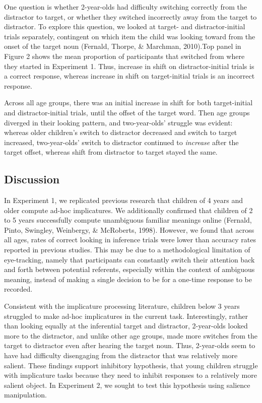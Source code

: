\documentclass[a4paper,man,apacite,floatsintext]{apa6}
\begin{document}
One question is whether 2-year-olds had difficulty switching correctly
from the distractor to target, or whether they switched incorrectly away
from the target to distractor. To explore this question, we looked at
target- and distractor-initial trials separately, contingent on which
item the child was looking toward from the onset of the target noun
(Fernald, Thorpe, \& Marchman, 2010).Top panel in Figure 2 shows the
mean proportion of participants that switched from where they started in
Experiment 1. Thus, increase in shift on distractor-initial trials is a
correct response, whereas increase in shift on target-initial trials is
an incorrect response.

Across all age groups, there was an initial increase in shift for both
target-initial and distractor-initial trials, until the offset of the
target word. Then age groups diverged in their looking pattern, and
two-year-olds' struggle was evident: whereas older children's switch to
distractor decreased and switch to target increased, two-year-olds'
switch to distractor continued to \emph{increase} after the target
offset, whereas shift from distractor to target stayed the same.

\subsection{Discussion}\label{discussion}

In Experiment 1, we replicated previous research that children of 4
years and older compute ad-hoc implicatures. We additionally confirmed
that children of 2 to 5 years successfully compute unambiguous familiar
meanings online (Fernald, Pinto, Swingley, Weinbergy, \& McRoberts,
1998). However, we found that across all ages, rates of correct looking
in inference trials were lower than accuracy rates reported in previous
studies. This may be due to a methodological limitation of eye-tracking,
namely that participants can constantly switch their attention back and
forth between potential referents, especially within the context of
ambiguous meaning, instead of making a single decision to be for a
one-time response to be recorded.

Consistent with the implicature processing literature, children below 3
years struggled to make ad-hoc implicatures in the current task.
Interestingly, rather than looking equally at the inferential target and
distractor, 2-year-olds looked more to the distractor, and unlike other
age groups, made more switches from the target to distractor even after
hearing the target noun. Thus, 2-year-olds seem to have had difficulty
disengaging from the distractor that was relatively more salient. These
findings support inhibitory hypothesis, that young children struggle
with implicature tasks because they need to inhibit responses to a
relatively more salient object. In Experiment 2, we sought to test this
hypothesis using salience manipulation.
\end{document}
